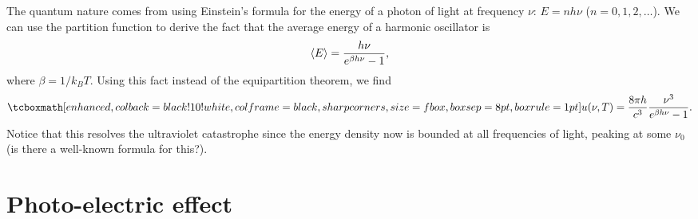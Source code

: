 The quantum nature comes from using Einstein's formula for the energy of a photon of light at frequency $\nu$: $E = n h \nu$ ($n = 0,1,2,\ldots$).
We can use the partition function to derive the fact that the average energy of a harmonic oscillator is
\begin{eqnarray}
    \expval{E} = \frac{h \nu}{e^{\beta h \nu} - 1}
,\end{eqnarray}
where $\beta = 1/k_{B}T$.
Using this fact instead of the equipartition theorem, we find
\begin{eqnarray}
    \eqbox{ u(\nu,T) = \frac{8 \pi h}{c^3} \frac{\nu^3}{e^{\beta h \nu} - 1} }
.\end{eqnarray}
Notice that this resolves the ultraviolet catastrophe since the energy density now is bounded at all frequencies of light, peaking at some $\nu_0$ (is there a well-known formula for this?).


\section{Photo-electric effect}


